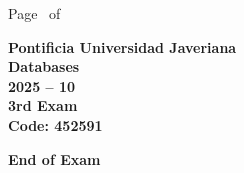 \documentclass[11pt, addpoints, answers]{exam}\usepackage[utf8]{inputenc}
\begin{document}
\begin{coverpages}
\begin{center}
			\vspace{3mm}
			\leavevmode \hspace{5mm} 
		\end{center}
	\end{coverpages}

	\footer{} {Page \thepage\ of \numpages} {}

	\centering
	\textbf{\Large Pontificia Universidad Javeriana}\\
	\textbf{\Large Databases} \\
	\textbf{\large 2025 -- 10} \\
	\textbf{\large 3rd Exam} \\
	\textbf{Code: 452591}


	\begin{questions}
		
		
		
		
		
		
		
		
		
		
		
		
		
		
		
		
		
		
		
		
	\end{questions}

	\vspace{5mm}
	\noindent \textbf{End of Exam}
\end{document}
